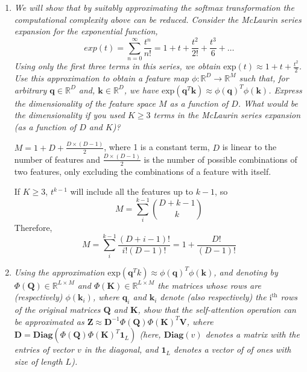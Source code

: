 \documentclass[12pt]{article}
\begin{document}
\begin{enumerate}[leftmargin=\labelsep]
    \item \textit{We will show that by suitably approximating the softmax transformation the computational complexity above can be reduced. Consider the McLaurin series expansion for the exponential function,}
          \begin{equation*}
              exp(t) = \sum_{n=0}^{\infty} \frac{t^n}{n!} = 1 + t + \frac{t^2}{2!} + \frac{t^3}{6} + \dots
          \end{equation*}
          \textit{Using only the first three terms in this series, we obtain $\text{exp}(t) \approx 1 + t + \frac{t^2}{2}$. Use this approximation to obtain a feature map $\phi: \mathbb{R}^D \rightarrow \mathbb{R}^M$ such that, for arbitrary $\textbf{q} \in \mathbb{R}^D$ and, $\textbf{k} \in \mathbb{R}^D$, we have $\text{exp}(\textbf{q}^T\textbf{k}) \approx \phi(\textbf{q})^T\phi(\textbf{k})$. Express the dimensionality of the feature space $M$ as a function of $D$. What would be the dimensionality if you used $K \ge 3$ terms in the McLaurin series expansion (as a function of $D$ and $K$)?}

          \vspace{12pt}

          $M = 1 + D + \frac{D \times (D - 1)}{2}$, where 1 is a constant term, $D$ is linear to the number of features and $\frac{D \times (D - 1)}{2}$ is the number of possible combinations of two features, only excluding the combinations of a feature with itself.

          \vspace{12pt}

          If $K \ge 3$, $t^{k-1}$ will include all the features up to $k-1$, so
          \begin{equation}
              M = \sum_{i}^{k-1} {D + k - 1 \choose k}
          \end{equation}
          Therefore,
          \begin{equation}
              M = \sum_{i}^{k-1} \frac{(D + i - 1)!}{i!(D - 1)!} = 1 + \frac{D!}{(D-1)!}
          \end{equation}

    \item \textit{Using the approximation $\text{exp}(\textbf{q}^Tk) \approx \phi(\textbf{q})^T \phi(\textbf{k})$, and denoting by $\Phi({\textbf{Q}}) \in \mathbb{R}^{L \times M}$ and $\Phi({\textbf{K}}) \in \mathbb{R}^{L \times M}$ the matrices whose rows are (respectively) $\phi(\textbf{k}_i)$, where $\textbf{q}_i$ and $\textbf{k}_i$ denote (also respectively) the $\text{i}^{\text{th}}$ rows of the original matrices $\textbf{Q}$ and $\textbf{K}$, show that the self-attention operation can be approximated as $\mathbf{Z} \approx \mathbf{D}^{-1}\Phi({\textbf{Q}})\Phi({\textbf{K}})^T\mathbf{V}$, where $\mathbf{D} = \textbf{Diag}(\Phi({\textbf{Q}})\Phi({\textbf{K}})^T\mathbf{1}_L)$ (here, $\textbf{Diag}(v)$ denotes a matrix with the entries of vector $v$ in the diagonal, and $\mathbf{1}_L$ denotes a vector of of ones with size of length $L$).}


\end{enumerate}
\end{document}
